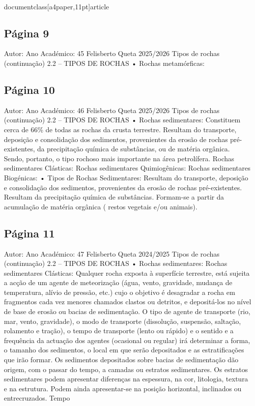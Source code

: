 \\documentclass[a4paper,11pt]{article}
\begin{document}
\subsection*{Página 9}
Autor:
Ano Académico:
45
Felisberto Queta
2025/2026
Tipos de rochas (continuação)
2.2 – TIPOS DE ROCHAS
•
Rochas metamórficas:



\subsection*{Página 10}
Autor:
Ano Académico:
46
Felisberto Queta
2025/2026
Tipos de rochas (continuação)
2.2 – TIPOS DE ROCHAS
•
Rochas sedimentares: 
Constituem cerca de 66\% de todas as rochas da crusta terrestre.
Resultam do transporte, deposição e consolidação dos sedimentos, provenientes da erosão de 
rochas pré-existentes, da precipitação química de substâncias, ou de matéria orgânica. Sendo, 
portanto, o tipo rochoso mais importante na área petrolífera. 
Rochas sedimentares 
Clásticas: 
Rochas sedimentares 
Quimiogênicas: 
Rochas sedimentares 
Biogénicas: 
•
Tipos de Rochas Sedimentares: 
Resultam do transporte, deposição e consolidação dos sedimentos, 
provenientes da erosão de rochas pré-existentes.
Resultam da precipitação química de substâncias.
Formam-se a partir da acumulação de matéria orgânica ( restos vegetais 
e/ou animais).



\subsection*{Página 11}
Autor:
Ano Académico:
47
Felisberto Queta
2024/2025
Tipos de rochas (continuação)
2.2 – TIPOS DE ROCHAS
•
Rochas sedimentares: 
Rochas sedimentares Clásticas: 
Qualquer rocha exposta à superfície terrestre, está sujeita a acção
de um agente de meteorização (água, vento, gravidade, mudança
de
temperatura,
alívio
de
pressão,
etc.)
cujo
o
objetivo
é
desagradar a rocha em fragmentos cada vez menores chamados
clastos ou detritos, e depositá-los no nível de base de erosão ou
bacias de sedimentação.
O tipo de agente de transporte (rio, mar, vento, gravidade), o
modo de transporte (dissolução, suspensão, saltação, rolamento e
tração), o tempo de transporte (lento ou rápido) e o sentido e a
frequência da actuação dos agentes (ocasional ou regular) irá
determinar a forma, o tamanho dos sedimentos, o local em que
serão depositados e as estratificações que irão formar.
Os sedimentos depositados sobre bacias de sedimentação dão
origem,
com
o
passar
do
tempo,
a
camadas
ou
estratos
sedimentares.
Os
estratos
sedimentares
podem
apresentar
diferenças na espessura, na cor, litologia, textura e na estrutura.
Podem ainda apresentar-se na posição horizontal, inclinados ou
entrecruzados.
Tempo
\end{document}
